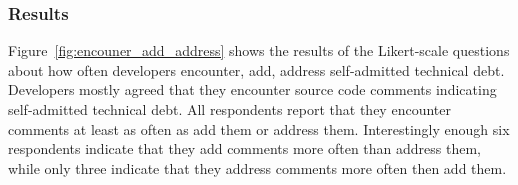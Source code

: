 

\subsubsection*{Results} 
Figure~\ref{fig:encouner_add_address} shows the results of the Likert-scale questions about how often developers encounter, add, address self-admitted technical debt. Developers mostly agreed that they encounter source code comments indicating self-admitted technical debt. 
All respondents report that they encounter \SATD comments at least as often as add them or address them.
Interestingly enough six respondents indicate that they add \SATD comments more often than address them,
while only three indicate that they address \SATD comments more often then add them.


